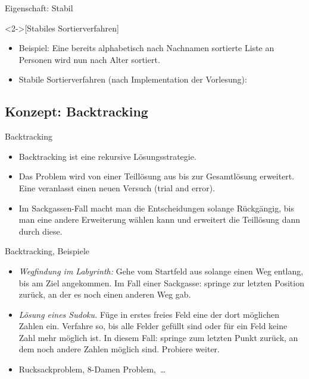 \begin{frame}{Eigenschaft: Stabil}
    \begin{definition}<2->[Stabiles Sortierverfahren]
    \end{definition}
    \begin{itemize}
        \widei
        \item<4-> Beispiel: Eine bereits alphabetisch nach Nachnamen sortierte Liste an Personen wird nun nach Alter sortiert. 
        \item<6-> Stabile Sortierverfahren (nach Implementation der Vorlesung): 
    \end{itemize}
\end{frame}


\subsection{Konzept: Backtracking}

\begin{frame}{Backtracking}
    \begin{itemize}[<+(1)->]
        \widei
        \item Backtracking ist eine rekursive Lösungsstrategie.
        \item Das Problem wird von einer Teillösung aus bis zur Gesamtlösung erweitert.\pause{} Eine  veranlasst einen neuen Versuch (trial and error).
        \item Im Sackgassen-Fall macht man die Entscheidungen solange Rückgängig, bis man eine andere Erweiterung wählen kann und erweitert die Teillösung dann durch diese.
    \end{itemize}
\end{frame}


\begin{frame}{Backtracking, Beispiele}
    \begin{itemize}[<+(1)->]
        \widei
        \item \emph{Wegfindung im Labyrinth:}\pause{} Gehe vom Startfeld aus solange einen Weg entlang, bis am Ziel angekommen.\pause{} Im Fall einer Sackgasse: springe zur letzten Position zurück, an der es noch einen anderen Weg gab.
        \item \emph{Lösung eines Sudoku.}\pause{} Füge in erstes freies Feld eine der dort möglichen Zahlen ein.\pause{} Verfahre so, bis alle Felder gefüllt sind oder für ein Feld keine Zahl mehr möglich ist.\pause{} In diesem Fall: springe zum letzten Punkt zurück, an dem noch andere Zahlen möglich sind. Probiere weiter.
        \item Rucksackproblem, 8-Damen Problem,~\ldots
    \end{itemize}
\end{frame}

